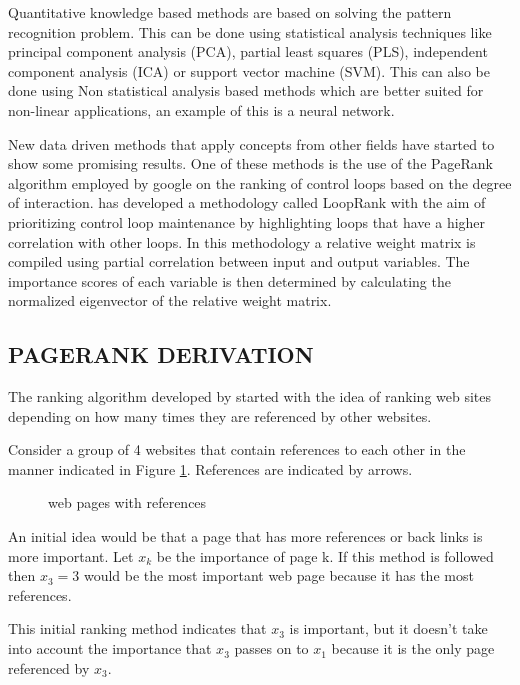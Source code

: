 Quantitative knowledge based methods are based on solving the pattern recognition problem. This can be done using statistical analysis techniques like principal component analysis (PCA), partial least squares (PLS), independent component analysis (ICA) or support vector machine (SVM). This can also be done using Non statistical analysis based methods which are better suited for non-linear applications, an example of this is a neural network.

New data driven methods that apply concepts from other fields have started to show some promising results. One of these methods is the use of the PageRank algorithm \cite{bryan200625} employed by google on the ranking of control loops based on the degree of interaction.\cite{farenzena2009looprank} has developed a methodology called LoopRank with the aim of prioritizing control loop maintenance by highlighting loops that have a higher correlation with other loops. In this methodology a relative weight matrix is compiled using partial correlation between input and output variables. The importance scores of each variable is then determined by calculating the normalized eigenvector of the relative weight matrix.\\

\subsection{PAGERANK DERIVATION}

The ranking algorithm developed by \cite{bryan200625} started with the idea of ranking web sites depending on how many times they are referenced by other websites.

Consider a group of 4 websites that contain references to each other in the manner indicated in Figure \ref{fig:7}. References are indicated by arrows.\\
\begin{figure}[H]
	\centering{}
	\caption{web pages with references}\label{fig:7}
\end{figure}
An initial idea would be that a page that has more references or back links is more important. Let $x_{k}$ be the importance of page k. If this method is followed then $x_{3} = 3$ would be the most important web page because it has the most references.

This initial ranking method indicates that $x_{3}$ is important, but it doesn't take into account the importance that $x_{3}$ passes on to $x_{1}$ because it is the only page referenced by $x_{3}$.

